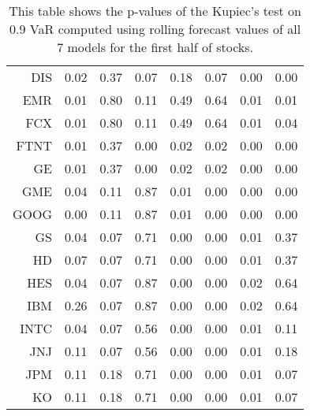 \begin{table}[ht]
\begin{tabular}{rrrrrrrr}
  DIS & 0.02 & 0.37 & 0.07 & 0.18 & 0.07 & 0.00 & 0.00 \\ 
  EMR & 0.01 & 0.80 & 0.11 & 0.49 & 0.64 & 0.01 & 0.01 \\ 
  FCX & 0.01 & 0.80 & 0.11 & 0.49 & 0.64 & 0.01 & 0.04 \\ 
  FTNT & 0.01 & 0.37 & 0.00 & 0.02 & 0.02 & 0.00 & 0.00 \\ 
  GE & 0.01 & 0.37 & 0.00 & 0.02 & 0.02 & 0.00 & 0.00 \\ 
  GME & 0.04 & 0.11 & 0.87 & 0.01 & 0.00 & 0.00 & 0.00 \\ 
  GOOG & 0.00 & 0.11 & 0.87 & 0.01 & 0.00 & 0.00 & 0.00 \\ 
  GS & 0.04 & 0.07 & 0.71 & 0.00 & 0.00 & 0.01 & 0.37 \\ 
  HD & 0.07 & 0.07 & 0.71 & 0.00 & 0.00 & 0.01 & 0.37 \\ 
  HES & 0.04 & 0.07 & 0.87 & 0.00 & 0.00 & 0.02 & 0.64 \\ 
  IBM & 0.26 & 0.07 & 0.87 & 0.00 & 0.00 & 0.02 & 0.64 \\ 
  INTC & 0.04 & 0.07 & 0.56 & 0.00 & 0.00 & 0.01 & 0.11 \\ 
  JNJ & 0.11 & 0.07 & 0.56 & 0.00 & 0.00 & 0.01 & 0.18 \\ 
  JPM & 0.11 & 0.18 & 0.71 & 0.00 & 0.00 & 0.01 & 0.07 \\ 
  KO & 0.11 & 0.18 & 0.71 & 0.00 & 0.00 & 0.01 & 0.07 \\ 
   \hline
\end{tabular}
\caption[Kupiec's test p-values, alpha =0.9 (1)]{This table shows the p-values of the Kupiec's test on 0.9 VaR computed using rolling forecast values of all 7 models for the first half of stocks.} 
\label{Table:Kupiec_test_rolling_0.9_1}
\end{table}
